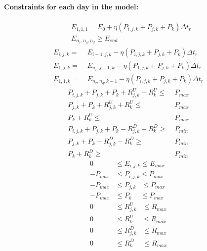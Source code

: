 \documentclass[11pt,twoside]{article}
\begin{document}
\paragraph{Constraints for each day in the model:}
\begin{subequations}
\begin{align}
&E_{1,1,1} = E_{0} + \eta (P_{i,j,k} + P_{j,k} + P_{k})\Delta t_r\\
&E_{n_r,n_q,n_d} \geq E_{end}
\end{align}
\label{eq1}
\end{subequations}
\vspace{-0.45in}
\begin{subequations}
\begin{align}
E_{i,j,k} =&\; E_{i-1,j,k}- \eta (P_{i,j,k} + P_{j,k} + P_{k})\Delta t_r\\
E_{1,j,k} =&\; E_{n_r,j-1,k}- \eta (P_{1,j,k} + P_{j,k} + P_{k})\Delta t_r\\
E_{1,1,k} =&\; E_{n_r,n_q,k-1}- \eta (P_{i,j,k} + P_{j,k} + P_{k})\Delta t_r
\end{align}
\label{eq2}
\end{subequations}
\vspace{-0.45in}
\begin{subequations}
\begin{align}
P_{i,j,k} + P_{j,k} + P_{k} + R^U_{j,k} + R^U_{k} \leq &\; P_{max}\\
P_{j,k} + P_{k} + R^U_{j,k} + R^U_{k} \leq &\; P_{max}\\
P_{k} + R^U_{k} \leq &\; P_{max}\\
P_{i,j,k} + P_{j,k} + P_{k} - R^D_{j,k} - R^D_{k} \geq &\; P_{min}\\
P_{j,k} + P_{k} - R^D_{j,k} - R^D_{k} \geq &\; P_{min}\\
P_{k} + R^D_{k} \geq &\; P_{min}
\end{align}
\label{eq3}
\end{subequations}\vspace{-0.45in}
\begin{subequations}
\begin{align}
0 & \leq E_{i,j,k} \leq E_{max}\\
-P_{max} & \leq P_{i,j,k} \leq P_{max}\\
-P_{max} & \leq P_{j,k}\phantom{i,} \leq P_{max}\\
-P_{max} & \leq P_{k}\phantom{i,j} \leq P_{max}\\
0 & \leq R^U_{j,k}\phantom{i,} \leq R_{max}\\
0 & \leq R^U_{k}\phantom{i,j} \leq R_{max}\\
0 & \leq R^D_{j,k}\phantom{i,} \leq R_{max}\\
0 & \leq R^D_{k}\phantom{i,j} \leq R_{max}
\end{align}
\label{eq4}
\end{subequations}\vspace{-0.45in}
\end{document}
